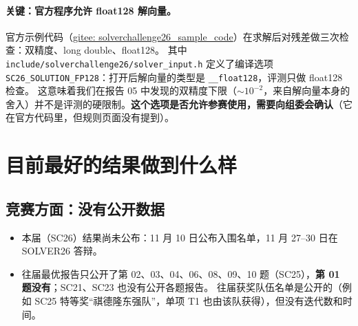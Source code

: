 \documentclass[11pt,a4paper]{ctexart}
\begin{document}
\paragraph{关键：官方程序允许 float128 解向量。}官方示例代码（\href{https://gitee.com/godjs/solverchallenge26_sample_code}{gitee: solverchallenge26\_sample\_code}）在求解后对残差做三次检查：双精度、long double、float128。
其中 \texttt{include/\allowbreak solverchallenge26/\allowbreak solver\_input.h} 定义了编译选项 \texttt{SC26\_\allowbreak SOLUTION\_\allowbreak FP128}：打开后解向量的类型是 \texttt{\_\_float128}，评测只做 float128 检查。
这意味着我们在报告 05 中发现的双精度下限（$\sim10^{-2}$，来自解向量本身的舍入）并不是评测的硬限制。\textbf{这个选项是否允许参赛使用，需要向组委会确认}（它在官方代码里，但规则页面没有提到）。

\section{目前最好的结果做到什么样}
\subsection{竞赛方面：没有公开数据}
\begin{itemize}
\item 本届（SC26）结果尚未公布：11 月 10 日公布入围名单，11 月 27--30 日在 SOLVER26 答辩。
\item 往届最优报告只公开了第 02、03、04、06、08、09、10 题（SC25），\textbf{第 01 题没有}；SC21、SC23 也没有公开各题报告。
往届获奖队伍名单是公开的（例如 SC25 特等奖“祺德隆东强队”，单项 T1 也由该队获得），但没有迭代数和时间。
\end{itemize}
\end{document}
